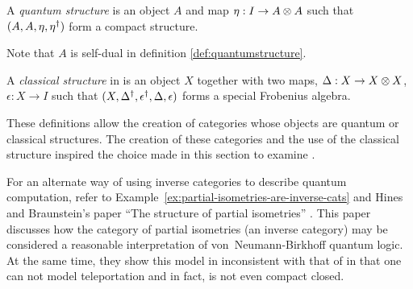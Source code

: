 \begin{definition}\label{def:quantumstructure}
  A \emph{quantum structure} is an object $A$ and map $\eta:I\to A\otimes A$ such that
  $(A,A,\eta,{\eta}^{\dagger})$ form a compact structure.
\end{definition}
Note that $A$ is self-dual in definition \ref{def:quantumstructure}.


\begin{definition}\label{def:classicalstructure}
  A \emph{classical structure} in \cD{} is an object $X$ together with two maps, $\Delta :X \to X\otimes X$,
  $\epsilon:X\to I$ such that $(X,{\Delta}^{\dagger},{\epsilon}^{\dagger},\Delta,\epsilon)$ forms a special
  Frobenius algebra.
\end{definition}

These definitions allow the creation of categories whose objects are quantum or classical
structures. The creation of these categories and the use of the classical structure inspired the
choice made in this section to examine \CFrob.


\begin{remark}
  For an alternate way of using inverse categories to describe quantum computation, refer to
  Example~\ref{ex:partial-isometries-are-inverse-cats} and Hines and Braunstein's paper ``The
  structure of partial isometries'' \cite{hines2010structure}. This paper discusses how the category
  of partial isometries (an inverse category) may be considered a reasonable interpretation of
  von~Neumann-Birkhoff quantum logic\cite{birkhoff1936logic}. At the same time, they show this model
  in inconsistent with that of \cite{abramsky04:catsemquantprot} in that one can not model
  teleportation and in fact, is not even compact closed.
\end{remark}


